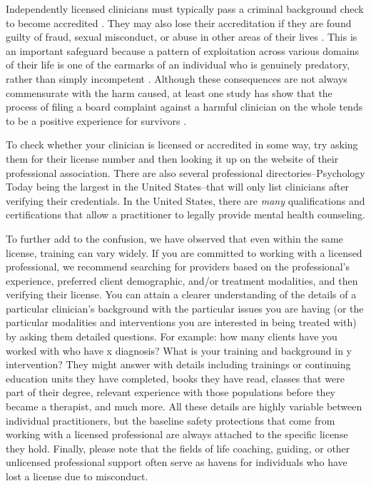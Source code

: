 \documentclass[12pt,letterpaper]{book}
\begin{document}
Independently licensed clinicians must typically pass a criminal background check to become accredited \cite{dunlap2021background}. They may also lose their accreditation if they are found guilty of fraud, sexual misconduct, or abuse in other areas of their lives \cite{barsky2023licensing}. This is an important safeguard because a pattern of exploitation across various domains of their life is one of the earmarks of an individual who is genuinely predatory, rather than simply incompetent \cite{cooke2001refining}. Although these consequences are not always commensurate with the harm caused, at least one study has show that the process of filing a board complaint against a harmful clinician on the whole tends to be a positive experience for survivors \cite{vinson1987complaintProcedures}.

To check whether your clinician is licensed or accredited in some way, try asking them for their license number and then looking it up on the website of their professional association. There are also several professional directories--Psychology Today being the largest in the United States--that will only list clinicians after verifying their credentials. In the United States, there are \textit{many} qualifications and certifications that allow a practitioner to legally provide mental health counseling. 

To further add to the confusion, we have observed that even within the same license, training can vary widely. If you are committed to working with a licensed professional, we recommend searching for providers based on the professional's experience, preferred client demographic, and/or treatment modalities, and then verifying their license. You can attain a clearer understanding of the details of a particular clinician's background with the particular issues you are having (or the particular modalities and interventions you are interested in being treated with) by asking them detailed questions. For example: how many clients have you worked with who have x diagnosis? What is your training and background in y intervention? They might answer with details including trainings or continuing education units they have completed, books they have read, classes that were part of their degree, relevant experience with those populations before they became a therapist, and much more. All these details are highly variable between individual practitioners, but the baseline safety protections that come from working with a licensed professional are always attached to the specific license they hold. Finally, please note that the fields of life coaching, guiding, or other unlicensed professional support often serve as havens for individuals who have lost a license due to misconduct. 
\end{document}
